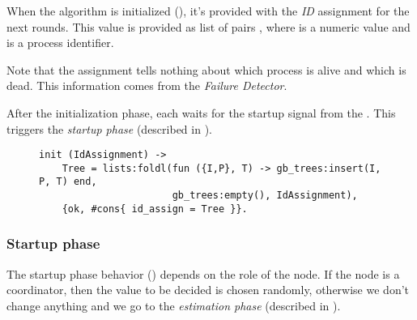 When the algorithm is initialized (), it's provided
with the \emph{ID} assignment for the next rounds. This value is provided
as list of pairs , where  is a numeric value
and  is a process identifier.

Note that the assignment tells nothing about which process is alive and
which is dead. This information comes from the \emph{Failure Detector}.

After the initialization phase, each  waits for the startup
signal from the . This triggers the \emph{startup phase}
(described in ).

\begin{figure}[hbt]
\begin{lstlisting}[caption={initialization phase},
                   label={code:ConsInit}]
init (IdAssignment) ->
    Tree = lists:foldl(fun ({I,P}, T) -> gb_trees:insert(I, P, T) end,
                       gb_trees:empty(), IdAssignment),
    {ok, #cons{ id_assign = Tree }}.
\end{lstlisting}
\end{figure}

\subsubsection{Startup phase} \label{subsub:ConsStartup}

The startup phase behavior () depends on the
role of the node. If the node is a coordinator, then the value to be
decided is chosen randomly, otherwise we don't change anything and we go
to the \emph{estimation phase} (described in
).

